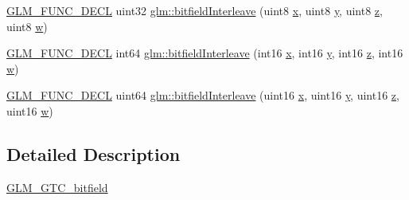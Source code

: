 \begin{DoxyCompactItemize}
\item 
\mbox{\hyperlink{setup_8hpp_ab2d052de21a70539923e9bcbf6e83a51}{G\+L\+M\+\_\+\+F\+U\+N\+C\+\_\+\+D\+E\+CL}} uint32 \mbox{\hyperlink{group__gtc__bitfield_ga447c0bbed9d60c14578626d8f03f3755}{glm\+::bitfield\+Interleave}} (uint8 \mbox{\hyperlink{glad_8h_a92d0386e5c19fb81ea88c9f99644ab1d}{x}}, uint8 \mbox{\hyperlink{glad_8h_a66ddd433d2cacfe27f5906b7e86faeed}{y}}, uint8 \mbox{\hyperlink{glad_8h_acb78bf1972d3eaf07da34ff2e0a2f133}{z}}, uint8 \mbox{\hyperlink{glad_8h_a1d0296e9e835f2e1ee17634af95fc1ec}{w}})
\item 
\mbox{\hyperlink{setup_8hpp_ab2d052de21a70539923e9bcbf6e83a51}{G\+L\+M\+\_\+\+F\+U\+N\+C\+\_\+\+D\+E\+CL}} int64 \mbox{\hyperlink{group__gtc__bitfield_ga09ee0be0fac790a1607a711e597dd9bf}{glm\+::bitfield\+Interleave}} (int16 \mbox{\hyperlink{glad_8h_a92d0386e5c19fb81ea88c9f99644ab1d}{x}}, int16 \mbox{\hyperlink{glad_8h_a66ddd433d2cacfe27f5906b7e86faeed}{y}}, int16 \mbox{\hyperlink{glad_8h_acb78bf1972d3eaf07da34ff2e0a2f133}{z}}, int16 \mbox{\hyperlink{glad_8h_a1d0296e9e835f2e1ee17634af95fc1ec}{w}})
\item 
\mbox{\hyperlink{setup_8hpp_ab2d052de21a70539923e9bcbf6e83a51}{G\+L\+M\+\_\+\+F\+U\+N\+C\+\_\+\+D\+E\+CL}} uint64 \mbox{\hyperlink{group__gtc__bitfield_gac8a926a7bfd9b23c22a4f685193fbfe1}{glm\+::bitfield\+Interleave}} (uint16 \mbox{\hyperlink{glad_8h_a92d0386e5c19fb81ea88c9f99644ab1d}{x}}, uint16 \mbox{\hyperlink{glad_8h_a66ddd433d2cacfe27f5906b7e86faeed}{y}}, uint16 \mbox{\hyperlink{glad_8h_acb78bf1972d3eaf07da34ff2e0a2f133}{z}}, uint16 \mbox{\hyperlink{glad_8h_a1d0296e9e835f2e1ee17634af95fc1ec}{w}})
\end{DoxyCompactItemize}


\subsection{Detailed Description}
\mbox{\hyperlink{group__gtc__bitfield}{G\+L\+M\+\_\+\+G\+T\+C\+\_\+bitfield}} 
